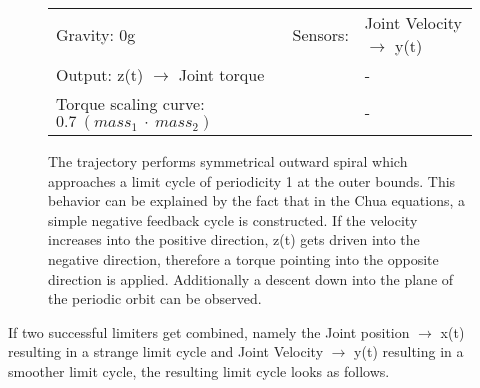 \documentclass[main]{subfiles}
\begin{document}
\begin{figure}[H]
	\centering
	\begin{minipage}{1.3\textwidth}
	\hspace*{-5em}
	\end{minipage}
	\caption[Joint Velocity \(\rightarrow\) y(t) limited chaotic controller controlling model leg]{The trajectory performs symmetrical outward spiral which approaches a limit cycle of periodicity 1 at the outer bounds. This behavior can be explained by the fact that in the Chua equations, a simple negative feedback cycle is constructed. If the velocity increases into the positive direction, z(t) gets driven into the negative direction, therefore a torque pointing into the opposite direction is applied. Additionally a descent down into the plane of the periodic orbit can be observed.}
	\begin{tabular}{l|ll}
	\hline 
	Gravity: 0g  & Sensors: & Joint Velocity \(\rightarrow\) y(t)\\
	 Output: z(t) \(\rightarrow\) Joint torque &  & - \\
	  Torque scaling curve: \(0.7~(mass_1~\cdot~mass_2)\) & & - \\
	  \hline
	\end{tabular}

	\label{figure:limited-model-leg4}
\end{figure}

If two successful limiters get combined, namely the Joint position \(\rightarrow\) x(t) resulting in a strange limit cycle and Joint Velocity \(\rightarrow\) y(t) resulting in a smoother limit cycle, the resulting limit cycle looks as follows.
\end{document}
